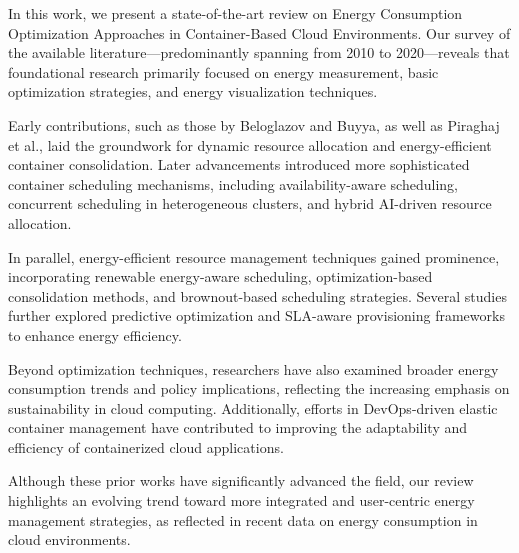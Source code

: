 \begin{multicols}{2}
In this work, we present a state-of-the-art review on Energy Consumption Optimization Approaches in Container-Based Cloud Environments. Our survey of the available literature—predominantly spanning from 2010 to 2020—reveals that foundational research primarily focused on energy measurement, basic optimization strategies, and energy visualization techniques\cite{beloglazov_energy_2010}.

Early contributions, such as those by \quad \qquad Beloglazov and Buyya\cite{beloglazov_energy_2010}, as well as 
Piraghaj et al.\cite{piraghaj_framework_2015}, laid the groundwork for dynamic resource allocation and 
energy-efficient container consolidation. Later advancements introduced more sophisticated container 
scheduling mechanisms, including availability-aware scheduling\cite{alahmad_availability-aware_2018}, 
concurrent scheduling in heterogeneous clusters\cite{hu_concurrent_2020}, and hybrid AI-driven resource 
allocation\cite{tan_hybrid_2019}.

In parallel, energy-efficient resource management techniques gained prominence, incorporating renewable 
energy-aware scheduling\cite{kumar_renewable_2019}, optimization-based consolidation methods\cite{shi_energy-aware_2018, piraghaj_framework_2015}, 
and brownout-based scheduling strategies\cite{xu_energy_2016}. Several studies further explored 
predictive optimization and SLA-aware provisioning frameworks to enhance energy 
efficiency\cite{dabbagh_energy-efficient_2015, hameed_survey_2016, li_sla-aware_2018, bui_energy_2017, 
carrega_energy-aware_2017}.

Beyond optimization techniques, researchers have also examined broader energy consumption trends and policy implications\cite{avgerinou_trends_2017}, reflecting the increasing emphasis on sustainability in cloud computing. Additionally, efforts in DevOps-driven elastic container management have contributed to improving the adaptability and efficiency of containerized cloud applications\cite{barna_delivering_2017}.

Although these prior works have significantly advanced the field, our review highlights an evolving trend toward more integrated and user-centric energy management strategies, as reflected in recent data on energy consumption in cloud environments\cite{masanet_2020, hintemann_2022, IEADataCentres}.

\end{multicols}
